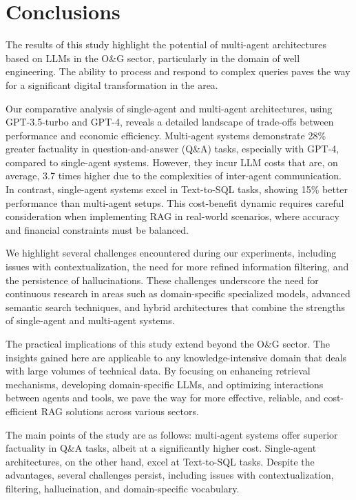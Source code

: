 \chapter{Conclusions}

    The results of this study highlight the potential of multi-agent architectures based on LLMs in the O\&G sector, particularly in the domain of well engineering. The ability to process and respond to complex queries paves the way for a significant digital transformation in the area.

    Our comparative analysis of single-agent and multi-agent architectures, using GPT-3.5-turbo and GPT-4, reveals a detailed landscape of trade-offs between performance and economic efficiency. Multi-agent systems demonstrate 28\% greater factuality in question-and-answer (Q\&A) tasks, especially with GPT-4, compared to single-agent systems. However, they incur LLM costs that are, on average, 3.7 times higher due to the complexities of inter-agent communication. In contrast, single-agent systems excel in Text-to-SQL tasks, showing 15\% better performance than multi-agent setups. This cost-benefit dynamic requires careful consideration when implementing RAG in real-world scenarios, where accuracy and financial constraints must be balanced.

    We highlight several challenges encountered during our experiments, including issues with contextualization, the need for more refined information filtering, and the persistence of hallucinations. These challenges underscore the need for continuous research in areas such as domain-specific specialized models, advanced semantic search techniques, and hybrid architectures that combine the strengths of single-agent and multi-agent systems.

    The practical implications of this study extend beyond the O\&G sector. The insights gained here are applicable to any knowledge-intensive domain that deals with large volumes of technical data. By focusing on enhancing retrieval mechanisms, developing domain-specific LLMs, and optimizing interactions between agents and tools, we pave the way for more effective, reliable, and cost-efficient RAG solutions across various sectors.

    The main points of the study are as follows: multi-agent systems offer superior factuality in Q\&A tasks, albeit at a significantly higher cost. Single-agent architectures, on the other hand, excel at Text-to-SQL tasks. Despite the advantages, several challenges persist, including issues with contextualization, filtering, hallucination, and domain-specific vocabulary.

